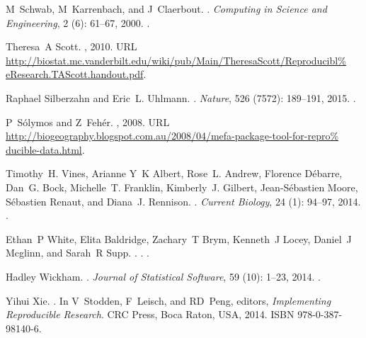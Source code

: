 \documentclass[11pt,a4paper]{article}
\begin{document}
\begin{thebibliography}{30}
M~Schwab, M~Karrenbach, and J~Claerbout.
.
\newblock \emph{Computing in Science and Engineering}, 2 (6):
  61--67, 2000.
\newblock {}.

Theresa~A Scott.
, 2010.
\newblock URL
  \url{http://biostat.mc.vanderbilt.edu/wiki/pub/Main/TheresaScott/Reproducibl%
eResearch.TAScott.handout.pdf}.

Raphael Silberzahn and Eric~L. Uhlmann.
.
\newblock \emph{Nature}, 526 (7572): 189--191, 2015.
\newblock {}.

P~S{\'{o}}lymos and Z~Feh{\'{e}}r.
, 2008.
\newblock URL
  \url{http://biogeography.blogspot.com.au/2008/04/mefa-package-tool-for-repro%
ducible-data.html}.

Timothy~H. Vines, Arianne Y~K Albert, Rose~L. Andrew, Florence D{\'{e}}barre,
  Dan~G. Bock, Michelle~T. Franklin, Kimberly~J. Gilbert, Jean-S{\'{e}}bastien
  Moore, S{\'{e}}bastien Renaut, and Diana~J. Rennison.
.
\newblock \emph{Current Biology}, 24 (1): 94--97, 2014.
\newblock {}.

Ethan~P White, Elita Baldridge, Zachary~T Brym, Kenneth~J Locey, Daniel~J
  Mcglinn, and Sarah~R Supp.
.
.
\newblock {}.

Hadley Wickham.
.
\newblock \emph{Journal of Statistical Software}, 59 (10):
  1--23, 2014.
\newblock {}.

Yihui Xie.
.
\newblock In V~Stodden, F~Leisch, and RD~Peng, editors, \emph{Implementing
  Reproducible Research}. CRC Press, Boca Raton, USA, 2014.
\newblock ISBN 978-0-387-98140-6.


\end{thebibliography}
\end{document}
